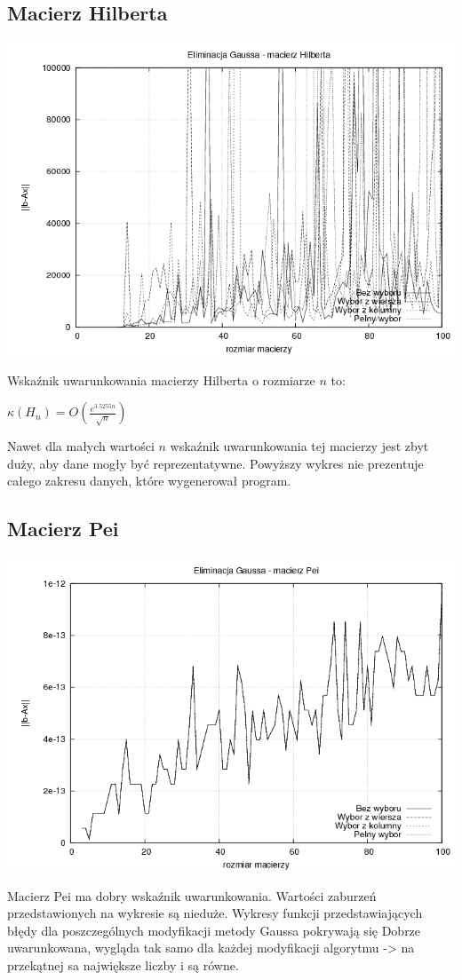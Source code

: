 \documentclass[a4paper,10pt]{article}
\begin{document}
    \subsection{Macierz Hilberta}
        \begin{center}
            \includegraphics[width=140mm]{hilbert_plot.png}
        \end{center}
        Wskaźnik uwarunkowania macierzy Hilberta o rozmiarze $n$ to:
        \begin{center}
            $ \kappa(H_{n}) = O(\frac{e^{3.5255n}}{\sqrt{n}})$
        \end{center}
            Nawet dla małych wartości $n$ wskaźnik uwarunkowania tej macierzy jest zbyt duży, aby dane mogły być reprezentatywne. Powyższy wykres nie prezentuje całego zakresu danych, które wygenerował program.
    \subsection{Macierz Pei}
        \begin{center}
            \includegraphics[width=140mm]{pei_plot.png}
        \end{center}
            Macierz Pei ma dobry wskaźnik uwarunkowania. Wartości zaburzeń przedstawionych na wykresie są nieduże. Wykresy funkcji przedstawiających błędy dla poszczególnych modyfikacji metody Gaussa pokrywają się
        Dobrze uwarunkowana, wygląda tak samo dla każdej modyfikacji algorytmu -> na przekątnej sa największe liczby i są równe.
\end{document}
